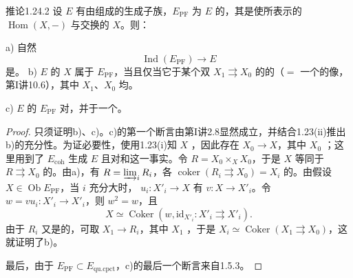 \begin{SGAresult}{推论}{1.24.2}
设 $E$ 有由组成的生成子族，$E_{\mathrm{PF}}$ 为 $E$ 的，其是使所表示的 $\operatorname{Hom}(X,-)$ 与交换的 $X$。则：

a) 自然
\[
\operatorname{Ind}(E_{\mathrm{PF}})\longrightarrow E
\]
是。
b) $E$ 的 $X$ 属于 $E_{\mathrm{PF}}$，当且仅当它于某个双 $X_1\rightrightarrows X_0$ 的的（$=$ 一个的像，第I讲10.6），其中 $X_1$、$X_0$ 均。

c) $E$ 的 $E_{\mathrm{PF}}$ 对，并于一个。
\end{SGAresult}
\begin{proof}
只须证明b)、c)。c)的第一个断言由第I讲2.8显然成立，并结合1.23(ii)推出b)的充分性。为证必要性，使用1.23(i)知 $X$ ，因此存在 $X_0\to X$，其中 $X_0$ ；这里用到了 $E_{\mathrm{coh}}$ 生成 $E$ 且对和这一事实。令 $R=X_0\times_X X_0$，于是 $X$ 等同于 $R\rightrightarrows X_0$ 的。由a)，有 $R=\varinjlim_iR_i$，各 $\operatorname{coker}(R_i\rightrightarrows X_0)=X_i$ 的。由假设 $X\in\operatorname{Ob}E_{\mathrm{PF}}$，当 $i$ 充分大时， $u_i:X'_i\to X$ 有 $v:X\to X'_i$。令 $w=vu_i:X'_i\to X'_i$，则 $w^2=w$，且
\[
X\simeq\operatorname{Coker}(w,\mathrm{id}_{X'_i}:X'_i\rightrightarrows X'_i).
\]
由于 $R_i$ 又是的，可取 $X_1\to R_i$，其中 $X_1$ ，于是 $X_i\simeq\operatorname{Coker}(X_1\rightrightarrows X_0)$，这就证明了b)。

最后，由于 $E_{\mathrm{PF}}\subset E_{\mathrm{qu.cpct}}$，c)的最后一个断言来自1.5.3。
\end{proof}
